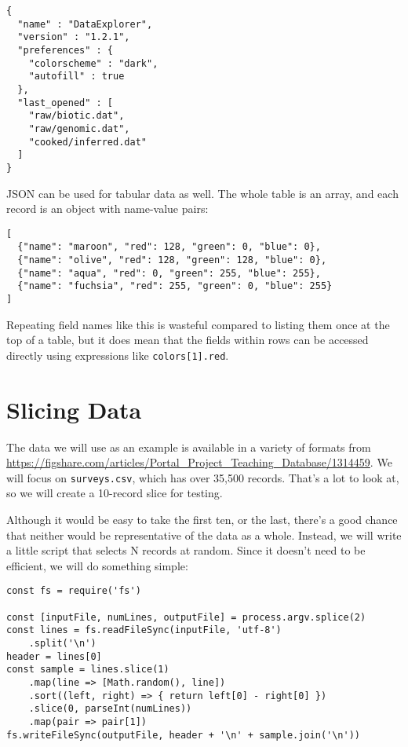 \begin{verbatim}
{
  "name" : "DataExplorer",
  "version" : "1.2.1",
  "preferences" : {
    "colorscheme" : "dark",
    "autofill" : true
  },
  "last_opened" : [
    "raw/biotic.dat",
    "raw/genomic.dat",
    "cooked/inferred.dat"
  ]
}
\end{verbatim}

JSON can be used for tabular data as well.
The whole table is an array,
and each record is an object with name-value pairs:

\begin{verbatim}
[
  {"name": "maroon", "red": 128, "green": 0, "blue": 0},
  {"name": "olive", "red": 128, "green": 128, "blue": 0},
  {"name": "aqua", "red": 0, "green": 255, "blue": 255},
  {"name": "fuchsia", "red": 255, "green": 0, "blue": 255}
]
\end{verbatim}

Repeating field names like this is wasteful compared to listing them once at the top of a table,
but it does mean that the fields within rows can be accessed directly
using expressions like \texttt{colors[1].red}.

\section{Slicing Data}\label{s:dataman-slicing}

The data we will use as an example is available in a variety of formats from \url{https://figshare.com/articles/Portal_Project_Teaching_Database/1314459}.
We will focus on \texttt{surveys.csv},
which has over 35,500 records.
That's a lot to look at,
so we will create a 10-record slice for testing.

Although it would be easy to take the first ten,
or the last,
there's a good chance that neither would be representative of the data as a whole.
Instead,
we will write a little script that selects N records at random.
Since it doesn't need to be efficient,
we will do something simple:

\begin{verbatim}
const fs = require('fs')

const [inputFile, numLines, outputFile] = process.argv.splice(2)
const lines = fs.readFileSync(inputFile, 'utf-8')
    .split('\n')
header = lines[0]
const sample = lines.slice(1)
    .map(line => [Math.random(), line])
    .sort((left, right) => { return left[0] - right[0] })
    .slice(0, parseInt(numLines))
    .map(pair => pair[1])
fs.writeFileSync(outputFile, header + '\n' + sample.join('\n'))
\end{verbatim}

